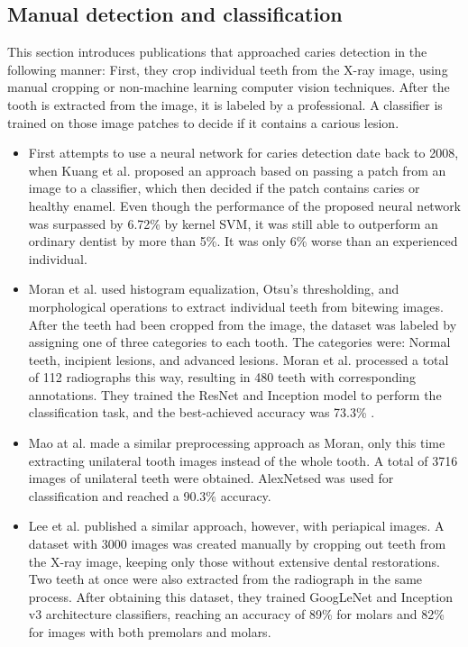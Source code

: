 \subsection{Manual detection and classification}
This section introduces publications that approached caries detection in the following manner: First, they crop individual teeth from the X-ray image, using manual cropping or non-machine learning computer vision techniques. After the tooth is extracted from the image, it is labeled by a professional. A classifier is trained on those image patches to decide if it contains a carious lesion.
\begin{itemize}
    \item First attempts to use a neural network for caries detection date back to 2008, when Kuang et al. \cite{Kuang2008} proposed an approach based on passing a patch from an image to a classifier, which then decided if the patch contains caries or healthy enamel. Even though the performance of the proposed neural network was surpassed by 6.72\% by kernel SVM, it was still able to outperform an ordinary dentist by more than 5\%. It was only 6\% worse than an experienced individual.
    \item Moran et al.\cite{Moran2021} used histogram equalization, Otsu's thresholding, and morphological operations to extract individual teeth from bitewing images. After the teeth had been cropped from the image, the dataset was labeled by assigning one of three categories to each tooth. The categories were: Normal teeth, incipient lesions, and advanced lesions. Moran et al. processed a total of 112 radiographs this way, resulting in 480 teeth with corresponding annotations. They trained the ResNet and Inception model to perform the classification task, and the best-achieved accuracy was 73.3\% \cite{Moran2021}.
    \item{Mao at al. \cite{Mao2021}} made a similar preprocessing approach as Moran, only this time extracting unilateral tooth images instead of the whole tooth. A total of 3716 images of unilateral teeth were obtained. AlexNetsed was used for classification and reached a 90.3\% accuracy.
    \item{Lee et al. \cite{Lee2018}} published a similar approach, however, with periapical images. A dataset with 3000 images was created manually by cropping out teeth from the X-ray image, keeping only those without extensive dental restorations. Two teeth at once were also extracted from the radiograph in the same process. After obtaining this dataset, they trained GoogLeNet and Inception v3 architecture classifiers, reaching an accuracy of 89\%  for molars and 82\% for images with both premolars and molars.
\end{itemize}


